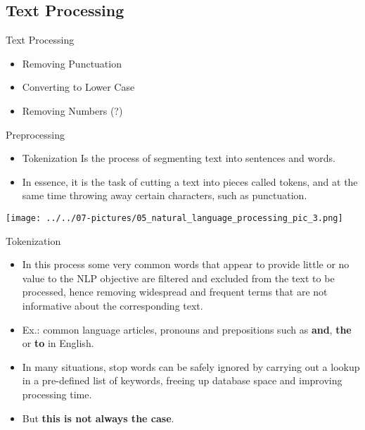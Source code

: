 \documentclass[11pt]{beamer}
\begin{document}
\subsection{Text Processing \\ \scalebox{0.8}{}}
\begin{frame}{Text Processing}
	\begin{itemize}
		\item Removing Punctuation
		\item Converting to Lower Case
		\item Removing Numbers (?)
	\end{itemize}
\end{frame}
\begin{frame}{Preprocessing}
	\begin{itemize}
		\item Tokenization Is the process of segmenting text into sentences and words. 
		\item In essence, it is the task of cutting a text into pieces called tokens, and at the same time throwing away certain characters, such as punctuation. 
	\end{itemize}
	\begin{center}
	\texttt{[image: ../../07-pictures/05\_natural\_language\_processing\_pic\_3.png]}
	\end{center}
\end{frame}
\begin{frame}{Tokenization}
	\begin{itemize}
		\item In this process some very common words that appear to provide little or no value to the NLP objective are filtered and excluded from the text to be processed, hence removing widespread and frequent terms that are not informative about the corresponding text.
		\item Ex.: common language articles, pronouns and prepositions such as \textbf{and}, \textbf{ the} or \textbf{ to} in English.
		\item In many situations, stop words can be safely ignored by carrying out a lookup in a pre-defined list of keywords, freeing up database space and improving processing time.
		\item But \textbf{this is not always the case}.
	\end{itemize}
\end{frame}
\end{document}

